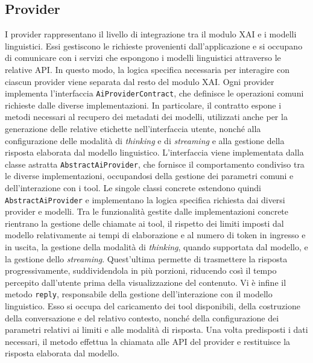 \subsection{Provider}
I provider rappresentano il livello di integrazione tra il modulo XAI e i modelli linguistici. Essi gestiscono le richieste provenienti dall'applicazione e si occupano di 
comunicare con i servizi che espongono i modelli linguistici attraverso le relative API. In questo modo, la logica specifica necessaria per interagire con ciascun provider 
viene separata dal resto del modulo XAI.
\newline
Ogni provider implementa l'interfaccia \texttt{AiProviderContract}, che definisce le operazioni comuni richieste dalle diverse implementazioni. In particolare, il contratto 
espone i metodi necessari al recupero dei metadati dei modelli, utilizzati anche per la generazione delle relative etichette nell'interfaccia utente, nonché alla configurazione 
delle modalità di \textit{thinking} e di \textit{streaming} e alla gestione della risposta elaborata dal modello linguistico.
\newline
L'interfaccia viene implementata dalla classe astratta \texttt{AbstractAiProvider}, che fornisce il comportamento condiviso tra le diverse implementazioni, occupandosi della 
gestione dei parametri comuni e dell'interazione con i tool. Le singole classi concrete estendono quindi \texttt{AbstractAiProvider} e implementano la logica specifica richiesta 
dai diversi provider e modelli.
\newline
Tra le funzionalità gestite dalle implementazioni concrete rientrano la gestione delle chiamate ai tool, il rispetto dei limiti imposti dal modello relativamente ai tempi di 
elaborazione e al numero di token in ingresso e in uscita, la gestione della modalità di \textit{thinking}, quando supportata dal modello, e la gestione dello \textit{streaming}. 
Quest'ultima permette di trasmettere la risposta progressivamente, suddividendola in più porzioni, riducendo così il tempo percepito dall'utente prima della visualizzazione del 
contenuto.
\newline
Vi è infine il metodo \texttt{reply}, responsabile della gestione dell'interazione con il modello linguistico. Esso si occupa del caricamento dei tool disponibili, della 
costruzione della conversazione e del relativo contesto, nonché della configurazione dei parametri relativi ai limiti e alle modalità di risposta. Una volta predisposti i 
dati necessari, il metodo effettua la chiamata alle API del provider e restituisce la risposta elaborata dal modello.

